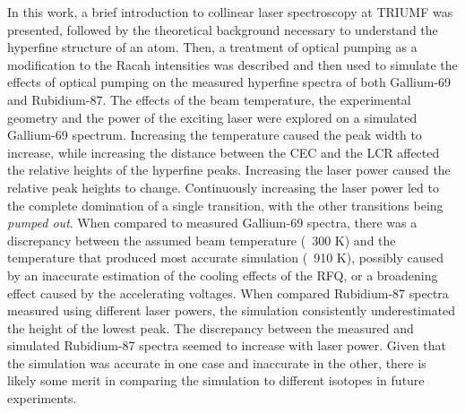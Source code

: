 \noindent In this work, a brief introduction to collinear laser spectroscopy at TRIUMF was presented, followed by the theoretical background necessary to understand the hyperfine structure of an atom. Then, a treatment of optical pumping as a modification to the Racah intensities was described and then used to simulate the effects of optical pumping on the measured hyperfine spectra of both Gallium-69 and Rubidium-87. The effects of the beam temperature, the experimental geometry and the power of the exciting laser were explored on a simulated Gallium-69 spectrum. Increasing the temperature caused the peak width to increase, while increasing the distance between the CEC and the LCR affected the relative heights of the hyperfine peaks. Increasing the laser power caused the relative peak heights to change. Continuously increasing the laser power led to the complete domination of a single transition, with the other transitions being \emph{pumped out}. When compared to measured Gallium-69 spectra, there was a discrepancy between the assumed beam temperature (~300 K) and the temperature that produced most accurate simulation (~910 K), possibly caused by an inaccurate estimation of the cooling effects of the RFQ, or a broadening effect caused by the accelerating voltages. When compared Rubidium-87 spectra measured using different laser powers, the simulation consistently underestimated the height of the lowest peak. The discrepancy between the measured and simulated Rubidium-87 spectra seemed to increase with laser power. Given that the simulation was accurate in one case and inaccurate in the other, there is likely some merit in comparing the simulation to different isotopes in future experiments. 